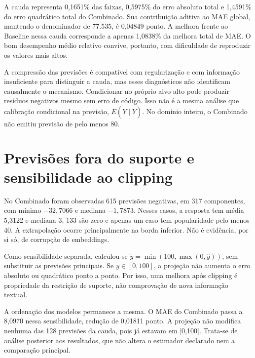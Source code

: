 A cauda representa 0,1651\% das faixas, 0,5975\% do erro absoluto total e 1,4591\% do erro quadrático total do Combinado. Sua contribuição aditiva ao MAE global, mantendo o denominador de 77.535, é 0,04849 ponto. A melhora frente ao Baseline nessa cauda corresponde a apenas 1,0838\% da melhora total de MAE. O bom desempenho médio relativo convive, portanto, com dificuldade de reproduzir os valores mais altos.

A compressão das previsões é compatível com regularização e com informação insuficiente para distinguir a cauda, mas esses diagnósticos não identificam causalmente o mecanismo. Condicionar no próprio alvo alto pode produzir resíduos negativos mesmo sem erro de código. Isso não é a mesma análise que calibração condicional na previsão, $E(Y\mid\widehat Y)$. No domínio inteiro, o Combinado não emitiu previsão de pelo menos 80.

\section{Previsões fora do suporte e sensibilidade ao clipping}
No Combinado foram observadas 615 previsões negativas, em 317 componentes, com mínimo $-32{,}7066$ e mediana $-1{,}7873$. Nesses casos, a resposta tem média 5,3122 e mediana 3; 133 são zero e apenas um caso tem popularidade pelo menos 40. A extrapolação ocorre principalmente na borda inferior. Não é evidência, por si só, de corrupção de embeddings.

Como sensibilidade separada, calculou-se $\widetilde y=\min(100,\max(0,\widehat y))$, sem substituir as previsões principais. Se $y\in[0,100]$, a projeção não aumenta o erro absoluto ou quadrático ponto a ponto. Por isso, uma melhora após clipping é propriedade da restrição de suporte, não comprovação de nova informação textual.


A ordenação dos modelos permanece a mesma. O MAE do Combinado passa a 8,0970 nessa sensibilidade, redução de 0,01811 ponto. A projeção não modifica nenhuma das 128 previsões da cauda, pois já estavam em [0,100]. Trata-se de análise posterior aos resultados, que não altera o estimador declarado nem a comparação principal.
